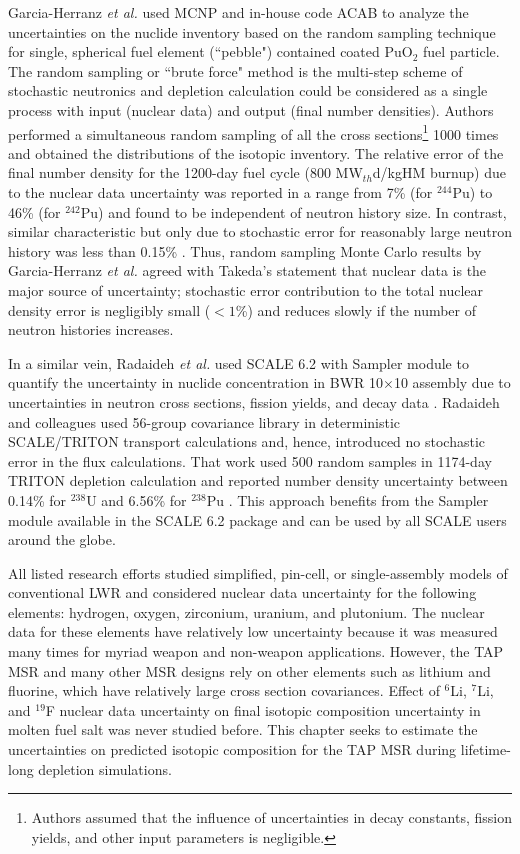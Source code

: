 Garcia-Herranz \emph{et al.} used MCNP and in-house code ACAB to analyze the 
uncertainties on the nuclide inventory based on the random sampling technique 
for single, spherical fuel element (``pebble") contained coated PuO$_2$ fuel 
particle. The random sampling or ``brute force" method is the multi-step 
scheme of stochastic neutronics and depletion calculation could be considered 
as a single process with input (nuclear data) and output (final number 
densities). Authors performed a simultaneous random sampling of all the cross 
sections\footnote{Authors assumed that the influence of uncertainties in decay 
constants, fission yields, and other input parameters is negligible.} 1000 
times and obtained the distributions of the isotopic inventory. The relative 
error of the final number density for the 1200-day fuel cycle (800 
MW$_{th}$d/kgHM burnup) due to the nuclear data uncertainty was reported in a 
range from 7\% (for $^{244}$Pu) to 46\% (for $^{242}$Pu) and found to be 
independent of neutron history size. 
In contrast, similar characteristic but only due to stochastic error for 
reasonably large neutron history was less than 0.15\% 
\cite{garcia-herranz_propagation_2008}. Thus, random sampling Monte Carlo 
results by Garcia-Herranz \emph{et al.} agreed with Takeda's statement that 
nuclear data is the major source of uncertainty; stochastic error contribution 
to the total nuclear density error is negligibly small ($<1$\%) and reduces
slowly if the number of neutron histories increases.

In a similar vein, Radaideh \emph{et al.} used SCALE 6.2 with Sampler module
\cite{rearden_scale_2018} to quantify the uncertainty in nuclide concentration 
in \gls{BWR} 10$\times$10 assembly due to uncertainties in neutron cross 
sections, fission yields, and decay data \cite{radaideh_uncertainty_2018}.  
Radaideh and colleagues used 56-group covariance library in deterministic 
SCALE/TRITON transport calculations and, hence, introduced no stochastic error 
in the flux calculations. That work used 500 random samples in 1174-day TRITON 
depletion calculation and reported number density uncertainty between 0.14\% 
for $^{238}$U and 6.56\% for $^{238}$Pu \cite{radaideh_novel_2019-1}. This 
approach benefits from the Sampler module available in the SCALE 6.2 package 
and can be used by all SCALE users around the globe.

All listed research efforts studied simplified, pin-cell, or single-assembly 
models of conventional \gls{LWR} and considered nuclear data uncertainty for 
the following elements: hydrogen, oxygen, zirconium, uranium, and plutonium. 
The nuclear data for these elements have relatively low uncertainty because it 
was measured many times for myriad weapon and non-weapon applications. 
However, the \gls{TAP} \gls{MSR} and many other \gls{MSR} designs rely on 
other elements such as lithium and fluorine, which have relatively large cross 
section covariances. Effect of $^6$Li, $^7$Li, and $^{19}$F nuclear data 
uncertainty 
on final isotopic composition uncertainty in molten fuel salt was never 
studied before. This chapter seeks to estimate the uncertainties on predicted 
isotopic composition for the \gls{TAP} \gls{MSR} during lifetime-long 
depletion simulations.

